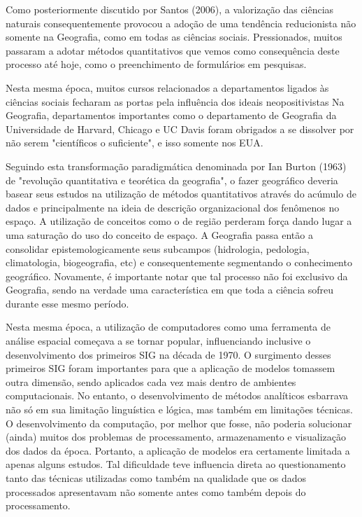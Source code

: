 Como posteriormente discutido por Santos (2006), a valorização das ciências naturais consequentemente provocou a adoção de uma tendência reducionista não somente na Geografia, como em todas as ciências sociais. Pressionados, muitos passaram a adotar métodos quantitativos que vemos como consequência deste processo até hoje, como o preenchimento de formulários em pesquisas.

Nesta mesma época, muitos cursos relacionados a departamentos ligados às ciências sociais fecharam as portas pela influência dos ideais neopositivistas Na Geografia, departamentos importantes como o departamento de Geografia da Universidade de Harvard, Chicago e UC Davis foram obrigados a se dissolver por não serem "científicos o suficiente", e isso somente nos EUA. 

Seguindo esta transformação paradigmática denominada por Ian Burton (1963) de "revolução quantitativa e teorética da geografia", o fazer geográfico deveria basear seus estudos na utilização de métodos quantitativos através do acúmulo de dados e principalmente na ideia de descrição organizacional dos fenômenos no espaço. A utilização de conceitos como o de região perderam força dando lugar a uma saturação do uso do conceito de espaço. A Geografia passa então a consolidar epistemologicamente seus subcampos (hidrologia, pedologia, climatologia, biogeografia, etc) e consequentemente segmentando o conhecimento geográfico. Novamente, é importante notar que tal processo não foi exclusivo da Geografia, sendo na verdade uma característica em que toda a ciência sofreu durante esse mesmo período.

Nesta mesma época, a utilização de computadores como uma ferramenta de análise espacial começava a se tornar popular, influenciando inclusive o desenvolvimento dos primeiros SIG na década de 1970. O surgimento desses primeiros SIG foram importantes para que a aplicação de modelos tomassem outra dimensão, sendo aplicados cada vez mais dentro de ambientes computacionais. No entanto, o desenvolvimento de métodos analíticos esbarrava não só em sua limitação linguística e lógica, mas também em limitações técnicas. O desenvolvimento da computação, por melhor que fosse, não poderia solucionar (ainda) muitos dos problemas de processamento, armazenamento e visualização dos dados da época. Portanto, a aplicação de modelos era certamente limitada a apenas alguns estudos. Tal dificuldade teve influencia direta ao questionamento tanto das técnicas utilizadas como também na qualidade que os dados processados apresentavam não somente antes como também depois do processamento.

